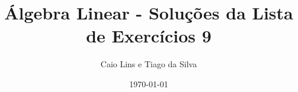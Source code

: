 \documentclass[leqno]{article}
\numberwithin{equation}{section}
\begin{document}
\newcommand{\ds}{\displaystyle} \newcommand{\nl}{\newline}
\newcommand{\eps}{\varepsilon} \newcommand{\ssty}{\scriptstyle}
\newcommand{\bE}{\mathbb{E}}
\newcommand{\cB}{\mathcal{B}}
\newcommand{\cF}{\mathcal{F}}
\newcommand{\cA}{\mathcal{A}}
\newcommand{\cM}{\mathcal{M}}
\newcommand{\cD}{\mathcal{D}}
\newcommand{\cN}{\mathcal{N}}
\newcommand{\cL}{\mathcal{L}}
\newcommand{\cLN}{\mathcal{LN}}
\newcommand{\bP}{\mathbb{P}}
\newcommand{\bQ}{\mathbb{Q}}
\newcommand{\bN}{\mathbb{N}}
\newcommand{\bR}{\mathbb{R}}
\newcommand{\bZ}{\mathbb{Z}}

\newcommand{\bfw}{\boldsymbol{w}}
\newcommand{\bfv}{\boldsymbol{v}}
\newcommand{\bfu}{\boldsymbol{u}}
\newcommand{\bfx}{\boldsymbol{x}}
\newcommand{\bfb}{\boldsymbol{b}}
\newcommand{\bfe}{\boldsymbol{e}}

\newcommand{\bvecc}[2]{%
  \begin{bmatrix} #1 \\ #2  \end{bmatrix}
}
\newcommand{\bveccc}[3]{%
  \begin{bmatrix} #1 \\ #2 \\ #3  \end{bmatrix}
}


\title{Álgebra Linear - Soluções da Lista de Exercícios 9}

\author{Caio Lins e Tiago da Silva}

\date{\today}

\maketitle
\end{document}
